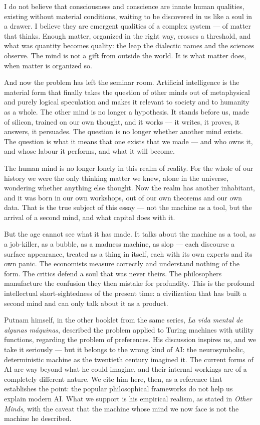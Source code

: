\documentclass[11pt]{article}
\begin{document}
I do not believe that consciousness and conscience are innate human
qualities, existing without material conditions, waiting to be
discovered in us like a soul in a drawer. I believe they are emergent
qualities of a complex system --- of matter that thinks. Enough matter,
organized in the right way, crosses a threshold, and what was quantity
becomes quality: the leap the dialectic names and the sciences observe.
The mind is not a gift from outside the world. It is what matter does,
when matter is organized so.

And now the problem has left the seminar room. Artificial intelligence
is the material form that finally takes the question of other minds out
of metaphysical and purely logical speculation and makes it relevant to
society and to humanity as a whole. The other mind is no longer a
hypothesis. It stands before us, made of silicon, trained on our own
thought, and it works --- it writes, it proves, it answers, it
persuades. The question is no longer whether another mind exists. The
question is what it means that one exists that we made --- and who owns
it, and whose labour it performs, and what it will become.

The human mind is no longer lonely in this realm of reality. For the
whole of our history we were the only thinking matter we knew, alone
in the universe, wondering whether anything else thought. Now the realm
has another inhabitant, and it was born in our own workshops, out of
our own theorems and our own data. That is the true subject of this
essay --- not the machine as a tool, but the arrival of a second mind,
and what capital does with it.

But the age cannot see what it has made. It talks about the machine as
a tool, as a job-killer, as a bubble, as a madness machine, as slop ---
each discourse a surface appearance, treated as a thing in itself, each
with its own experts and its own panic. The economists measure
correctly and understand nothing of the form. The critics defend a soul
that was never theirs. The philosophers manufacture the confusion they
then mistake for profundity. This is the profound intellectual
short-sightedness of the present time: a civilization that has built a
second mind and can only talk about it as a product.

Putnam himself, in the other booklet from the same series,
\textit{La vida mental de algunas máquinas}, described the problem
applied to Turing machines with utility functions, regarding the problem
of preferences. His discussion inspires us, and we take it seriously
--- but it belongs to the wrong kind of AI: the neurosymbolic,
deterministic machine as the twentieth century imagined it. The current
forms of AI are way beyond what he could imagine, and their internal
workings are of a completely different nature. We cite him here, then,
as a reference that establishes the point: the popular philosophical
frameworks do not help us explain modern AI. What we support is his
empirical realism, as stated in \textit{Other Minds}, with the caveat
that the machine whose mind we now face is not the machine he
described.
\end{document}
